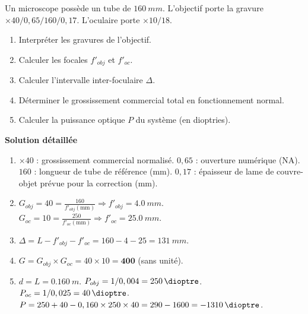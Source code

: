\documentclass[11pt]{article}
\begin{document}
\begin{exoresolu}
Un microscope possède un tube de $\SI{160}{mm}$. L'objectif porte la gravure $\times 40 / 0,65 / 160 / 0,17$. L'oculaire porte $\times 10 / 18$.
\begin{enumerate}
    \item Interpréter les gravures de l'objectif.
    \item Calculer les focales $f'_{obj}$ et $f'_{oc}$.
    \item Calculer l'intervalle inter-foculaire $\Delta$.
    \item Déterminer le grossissement commercial total en fonctionnement normal.
    \item Calculer la puissance optique $P$ du système (en dioptries).
\end{enumerate}
\textbf{Solution détaillée}
\begin{enumerate}
    \item $\times 40$ : grossissement commercial normalisé. $0,65$ : ouverture numérique (NA). $160$ : longueur de tube de référence (mm). $0,17$ : épaisseur de lame de couvre-objet prévue pour la correction (mm).
    \item $G_{obj} = 40 = \frac{160}{f'_{obj}(\text{mm})} \Rightarrow f'_{obj} = \SI{4,0}{mm}$.
        $G_{oc} = 10 = \frac{250}{f'_{oc}(\text{mm})} \Rightarrow f'_{oc} = \SI{25,0}{mm}$.
    \item $\Delta = L - f'_{obj} - f'_{oc} = 160 - 4 - 25 = \SI{131}{mm}$.
    \item $G = G_{obj} \times G_{oc} = 40 \times 10 = \textbf{400}$ (sans unité).
    \item $d = L = \SI{0,160}{m}$. $P_{obj} = 1/0,004 = \SI{250}{\dioptre}$. $P_{oc} = 1/0,025 = \SI{40}{\dioptre}$.
        $P = 250 + 40 - 0,160 \times 250 \times 40 = 290 - 1600 = \textbf{\SI{-1310}{\dioptre}}$.
\end{enumerate}
\end{exoresolu}
\end{document}
